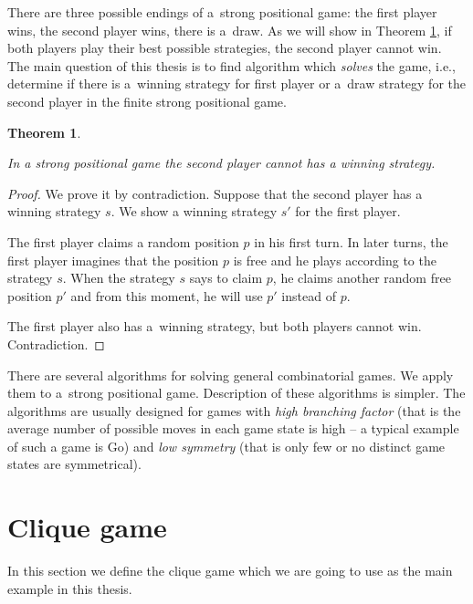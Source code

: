 There are three possible endings of a~strong positional game: the first player
wins, the second player wins, there is a~draw. As we will show in Theorem
\ref{stealingStrategy}, if both players play their best possible strategies,
the second player cannot win. The main question of this thesis is to find
algorithm which \emph{solves} the game, i.e., determine if there is a~winning
strategy for first player or a~draw strategy for the second player in the
finite strong positional game.

\newtheorem{theorem}{Theorem} 
\begin{theorem} \label{stealingStrategy} 

In a strong positional game the second player cannot has a winning strategy.

\end{theorem}

\begin{proof}

We prove it by contradiction. Suppose that the second player has a winning strategy
$s$. We show a winning strategy $s'$ for the first player. 

The first player claims a random position $p$ in his first turn. In later
turns, the first player imagines that the position $p$ is free and he plays
according to the strategy $s$. When the strategy $s$ says to claim $p$, he claims
another random free position $p'$ and from this moment, he will use $p'$ instead
of $p$.

The first player also has a~winning strategy, but both players cannot win.
Contradiction. 

\end{proof}

There are several algorithms for solving general combinatorial games. We apply
them to a~strong positional game. Description of these algorithms is simpler.
The algorithms are usually designed for games with \emph{high branching factor}
(that is the average number of possible moves in each game state is high --
a typical example of such a game is Go) and \emph{low
symmetry} (that is only few or no distinct game states are symmetrical). 


\section{Clique game}

In this section we define the clique game which we are going to use as the
main example in this thesis.

